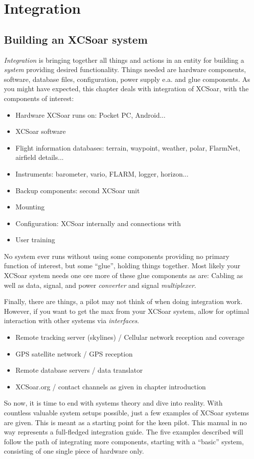 \chapter{Integration}\label{cha:Integration}

\section{Building an XCSoar system}
\emph{Integration} is bringing together all things and actions in an entity for  
building a \emph{system} providing desired functionality. Things needed are 
hardware components, software, database files, configuration, power supply e.a. 
and glue components. As you might have expected, this chapter deals with 
integration of XCSoar, with the components of interest:
\begin{itemize} 
\item Hardware XCSoar runs on: Pocket PC, Android...
\item XCSoar software
\item Flight information databases: terrain, waypoint, weather, polar, 
FlarmNet, airfield details...
\item Instruments: barometer, vario, FLARM, logger, horizon...
\item Backup components: second XCSoar unit
\item Mounting
\item Configuration: XCSoar internally and connections with
\item User training
\end{itemize}
No system ever runs without using some components providing no primary function 
of interest, but some ``glue'', holding things together.  Most likely your XCSoar
system needs one ore more of these glue components as are:
Cabling as well as data, signal, and power \emph{converter} and signal 
\emph{multiplexer}.

Finally, there are things, a pilot may not think of when doing integration work. 
However, if you want to get the max from your XCSoar system, allow for optimal 
interaction with other systems via \emph{interfaces}.
\begin{itemize}
\item Remote tracking server (skylines) / Cellular network reception and coverage
\item GPS satellite network / GPS reception
\item Remote database servers / data translator
\item XCSoar.org / contact channels as given in chapter introduction
\end{itemize}
So now, it is time to end with systems theory and dive into reality. With
countless valuable system setups possible, just a few examples of XCSoar systems 
are given. This is meant as a starting point for the 
keen pilot. This manual in no way represents a full-fledged integration guide.
The five examples described will follow the path of integrating more components, 
starting with a ``basic'' system, consisting of one single piece of hardware only.

